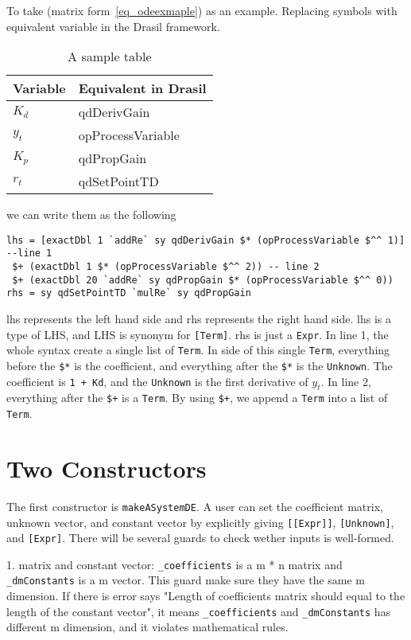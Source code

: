 To take (matrix form~\ref{eq_odeexmaple}) as an example. Replacing symbols with equivalent variable in the Drasil framework.

\begin{table}
	\begin{tabular}{ p{} p{} }
		\textbf{Variable} & \textbf{Equivalent in Drasil} \\
		\toprule
		$K_d$ & qdDerivGain\\
		$y_t$ & opProcessVariable\\
		$K_p$ & qdPropGain\\
		$r_t$ & qdSetPointTD\\
		\bottomrule	
	\end{tabular}	
	\caption{A sample table}	
	\label{tab_inputtype}
\end{table}

we can write them as the following
\begin{lstlisting}[language=HaskellUlisses]
lhs = [exactDbl 1 `addRe` sy qdDerivGain $* (opProcessVariable $^^ 1)] --line 1
 $+ (exactDbl 1 $* (opProcessVariable $^^ 2)) -- line 2
 $+ (exactDbl 20 `addRe` sy qdPropGain $* (opProcessVariable $^^ 0))
rhs = sy qdSetPointTD `mulRe` sy qdPropGain
\end{lstlisting}

lhs represents the left hand side and rhs represents the right hand side. lhs is a type of LHS, and LHS is synonym for \verb|[Term]|. rhs is just a \verb|Expr|. In line 1, the whole syntax create a single list of \verb|Term|. In side of this single \verb|Term|, everything before the \verb|$*| is the coefficient, and everything after the \verb|$*| is the \verb|Unknown|. The coefficient is \verb|1 + Kd|, and the \verb|Unknown| is the first derivative of $y_t$. In line 2, everything after the \verb|$+| is a \verb|Term|. By using \verb|$+|, we append a \verb|Term| into a list of \verb|Term|.

\section{Two Constructors}
The first constructor is \verb|makeASystemDE|. A user can set the coefficient matrix, unknown vector, and constant vector by explicitly giving \verb|[[Expr]]|, \verb|[Unknown]|, and \verb|[Expr]|. There will be several guards to check wether inputs is well-formed.

1. matrix and constant vector: \verb|_coefficients| is a m * n matrix and \verb|_dmConstants| is a m vector. This guard make sure they have the same m dimension. If there is error says "Length of coefficients matrix should equal to the length of the constant vector", it means \verb|_coefficients| and \verb|_dmConstants| has different m dimension, and it violates mathematical rules.

